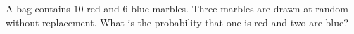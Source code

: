 A bag contains $10$ red and $6$ blue marbles. Three marbles are drawn at random without replacement. What is the probability that one is red and two are blue?
